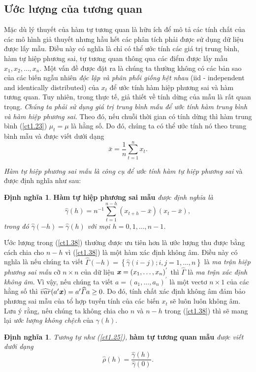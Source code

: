 \documentclass[12pt, a4paper,oneside]{book}
\theoremstyle{definition}
\newtheorem{dn}[theo]{Định nghĩa}
\begin{document}
\subsection{Ước lượng của tương quan}
Mặc dù lý thuyết của hàm tự tương quan là hữu ích để mô tả các tính chất của các mô hình giả thuyết nhưng hầu hết các phân tích phải được sử dụng dữ liệu được lấy mẫu. Điều này có nghĩa là chỉ có thể ước tính các giá trị trung bình, hàm tự hiệp phương sai, tự tương quan thông qua các điểm được lấy mẫu $x_1, x_2, \dots, x_n$. Một vấn đề được đặt ra là chúng ta thường không có các bản sao của các biến ngẫu nhiên \textit{độc lập và phân phối giống hệt nhau} (iid - independent and identically distributed) của $x_t$ để ước tính hàm hiệp phương sai và hàm tương quan. Tuy nhiên, trong thực tế, giả thiết về tính dừng của mẫu là rất quan trọng. \textit{Chúng ta phải sử dụng giá trị trung bình mẫu để ước tính hàm trung bình và hàm hiệp phương sai}. Theo đó, nếu chuỗi thời gian có tính dừng thì hàm trung bình (\ref{ct1.23}) $\mu_t=\mu$ là hằng số. Do đó, chúng ta có thể ước tính nó theo trung bình mẫu và được viết dưới dạng
\begin{equation}
\bar{x} = \frac{1}{n}\sum _ {t = 1 } ^ { n } x_{t}. \label{ct1.37}
\end{equation}

\textit{Hàm tự hiệp phương sai mẫu là công cụ để ước tính hàm tự hiệp phương sai} và được định nghĩa như sau:
\begin{dn}\cite{8} \textbf{Hàm tự hiệp phương sai mẫu} \textit{được định nghĩa là 
		\begin{equation}
		\widehat{\gamma}(h) = n^{-1}\sum _ {t = 1 } ^ {n-h} (x_{t+h}-\bar{x})(x_{t}-\bar{x}), \label{ct1.38}
		\end{equation} trong đó $\widehat{\gamma}(-h) = \widehat{\gamma}(h)$ với mọi $h= 0, 1, \dots, n-1$.}
\end{dn}
Ước lượng trong (\ref{ct1.38}) thường được ưu tiên hơn là ước lượng thu được bằng cách chia cho $n - h$ vì (\ref{ct1.38}) là một hàm xác định không âm. Điều này có nghĩa là nếu chúng ta viết $\widehat{\Gamma}(-h) =\left\lbrace \widehat{\gamma}(i-j); i, j=1, \dots, n\right\rbrace$ là \textit{ma trận hiệp phương sai mẫu} cỡ $n \times n$ của dữ liệu $\textbf{\textit{x}} = (x_{1}, \dots, x_{n})^{'}$ thì $\widehat{\Gamma}$ là \textit{ma trận xác định không âm}. Vì vậy, nếu chúng ta viết $a = (a_{1}, \dots, a_{n})^{'}$ là một vectơ $n \times 1$ của các hằng số thì $\widehat{var}(a'\textbf{\textit{x}}) = a'\widehat{\varGamma}a\geq 0$. Do đó, tính chất xác định không âm đảm bảo phương sai mẫu của tổ hợp tuyến tính của các biến $x_{t}$ sẽ luôn luôn không âm. Lưu ý rằng, nếu chúng ta không chia cho $n$ và $n - h$ trong (\ref{ct1.38}) thì sẽ mang lại \textit{ước lượng không chệch} của $\gamma(h)$.
\begin{dn}\cite{8} \textit{Tương tự như (\ref{ct1.25}),} \textbf{hàm tự tương quan mẫu}\textit{ được viết dưới dạng
		\begin{equation}
		\widehat{\rho}(h)=\dfrac{\widehat{\gamma}(h)}{\widehat{\gamma}(0)}. \label{ct1.39}
		\end{equation} }
\end{dn}
\end{document}
